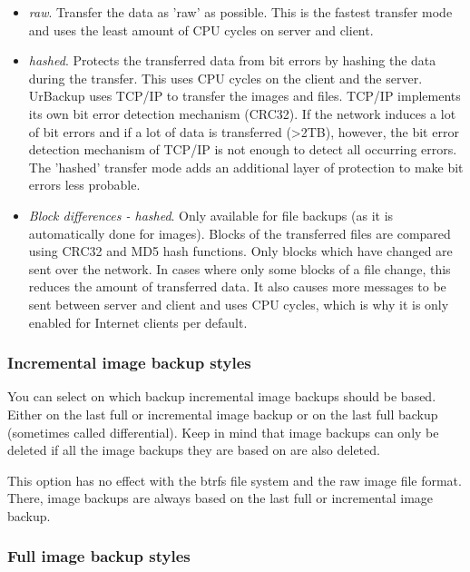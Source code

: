 \documentclass[a4paper,10pt]{article}
\begin{document}
\begin{itemize}
  \item \textsl{raw}. Transfer the data as 'raw' as possible. This is the fastest transfer
  		mode and uses the least amount of CPU cycles on server and client.
  \item \textsl{hashed}. Protects the transferred data from bit errors by hashing the data
  		during the transfer. This uses CPU cycles on the client and the server.\\
  		UrBackup uses TCP/IP to transfer the images and files. TCP/IP implements its own
  		bit error detection mechanism (CRC32). If the network induces a lot of bit errors
  		and if a lot of data is transferred (>2TB), however, the bit error detection mechanism
  		of TCP/IP is not enough to detect all occurring errors. The 'hashed' transfer mode
  		adds an additional layer of protection to make bit errors less probable.
  \item \textsl{Block differences - hashed}. Only available for file backups (as it is
  		automatically done for images). Blocks of the transferred files are compared using
  		CRC32 and MD5 hash functions. Only blocks which have changed are sent over the
  		network. In cases where only some blocks of a file change, this reduces the amount
  		of transferred data. It also causes more messages to be sent between server and
  		client and uses CPU cycles, which is why it is only enabled for Internet clients
  		per default. 
\end{itemize}

\subsubsection{Incremental image backup styles}

You can select on which backup incremental image backups should be based. Either on the last full or incremental image backup or on the last full backup (sometimes called differential).
Keep in mind that image backups can only be deleted if all the image backups they are based on are also deleted.

\par\null\par
This option has no effect with the btrfs file system and the raw image file format. There, image backups are always based on the last full or incremental image backup.

\subsubsection{Full image backup styles}
\end{document}
